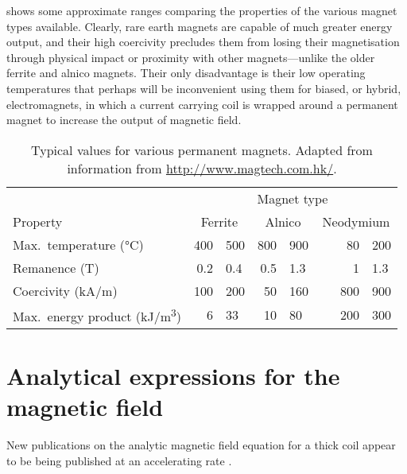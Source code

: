 shows some approximate ranges comparing the
properties of the various magnet types available. Clearly, rare earth
magnets are capable of much greater energy output, and their high
coercivity precludes them from losing their magnetisation through
physical impact or proximity with other magnets---unlike the older
ferrite and alnico magnets. Their only disadvantage is their low
operating temperatures that perhaps will be inconvenient using them
for biased, or hybrid, electromagnets, in which a current carrying
coil is wrapped around a permanent magnet to increase the output of
magnetic field.

\begin{table}
  \centering
  \begin{tabular}{@{} l r@{\,--\,}l r@{\,--\,}l r@{\,--\,}l @{}}
    \toprule
    & \multicolumn{6}{c}{Magnet type}\\
    \cmidrule{2-6}
    Property            & \multicolumn{2}{c}{Ferrite}
                        & \multicolumn{2}{c}{Alnico}
                        & \multicolumn{2}{c}{Neodymium}  \\
    \midrule
    Max.\ temperature (°C)    & \num{400} & \num{500} & \num{800} & \num{900} &    \num{ 80} & \num{200}  \\
    Remanence (T)             & \num{0.2} & \num{0.4} & \num{0.5} & \num{1.3} &    \num{  1} & \num{1.3}  \\
    Coercivity (\si{kA/m})    & \num{100} & \num{200} & \num{50 } & \num{160} & ~~~\num{800} & \num{900}  \\
    Max.\ energy product
               (\si{kJ/m^3})  & \num{6}   & \num{33}  & \num{10}  & \num{80}  &    \num{200} & \num{300}  \\
    \bottomrule
  \end{tabular}
  \caption[Typical values for various permanent magnets.]
  {Typical values for various permanent magnets.
   Adapted from information from \url{http://www.magtech.com.hk/}.}
\end{table}


\section{Analytical expressions for the magnetic field}

New publications on the analytic magnetic field equation for a thick coil appear to be being published at an accelerating rate \cite{danilov1971-nim,urankar1982-ietm,azzerboni1993-ietm,labinac2006-ajp,pechenkov2006-rndt,ravaud2010-emwaves}.

